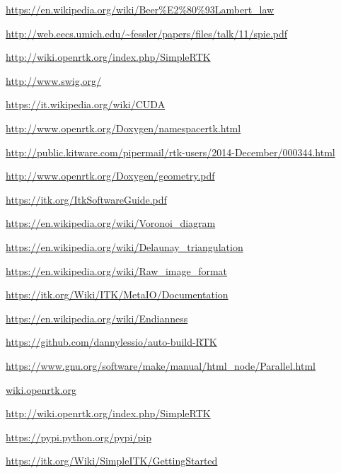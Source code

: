 \documentclass[a4paper,12pt, doubleside]{report}
\begin{document}
\begin{thebibliography}{1}
        \url{https://en.wikipedia.org/wiki/Beer%E2%80%93Lambert_law}
        
        \url{http://web.eecs.umich.edu/~fessler/papers/files/talk/11/spie.pdf}    
        
        \url{http://wiki.openrtk.org/index.php/SimpleRTK}
        
        \url{http://www.swig.org/}    
        
        \url{https://it.wikipedia.org/wiki/CUDA}
        
        \url{http://www.openrtk.org/Doxygen/namespacertk.html}
        
        \url{http://public.kitware.com/pipermail/rtk-users/2014-December/000344.html}
    
        \url{http://www.openrtk.org/Doxygen/geometry.pdf}
        
        \url{https://itk.org/ItkSoftwareGuide.pdf}   
        
        \url{https://en.wikipedia.org/wiki/Voronoi_diagram}
        
        \url{https://en.wikipedia.org/wiki/Delaunay_triangulation}
    
        \url{https://en.wikipedia.org/wiki/Raw_image_format}
    
        \url{https://itk.org/Wiki/ITK/MetaIO/Documentation} 
    
        \url{https://en.wikipedia.org/wiki/Endianness}


        
        \url{https://github.com/dannylessio/auto-build-RTK}
    
        \url{https://www.gnu.org/software/make/manual/html_node/Parallel.html}    
    
        \url{wiki.openrtk.org}    
        
        \url{http://wiki.openrtk.org/index.php/SimpleRTK}    
        
        \url{https://pypi.python.org/pypi/pip}    
        
        \url{https://itk.org/Wiki/SimpleITK/GettingStarted}
        

\end{thebibliography}
\end{document}
